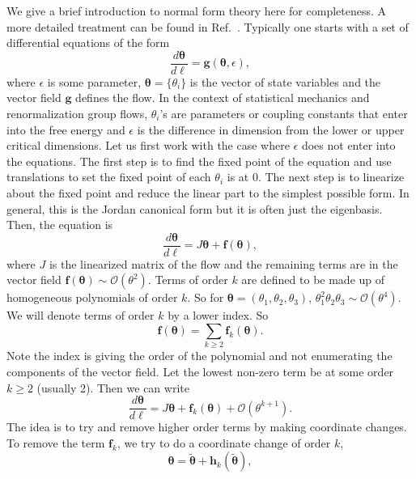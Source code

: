 \documentclass[
 reprint,
 amsmath,amssymb,
 aps, superscriptaddress, pre
]{revtex4-1}
\begin{document}
We give a brief introduction to normal form theory here for completeness. A more detailed treatment can be found in Ref.~\cite{PNFT1}. Typically one starts with a set of differential equations of the form 
\begin{equation}
 \frac{d \bm{\theta}}{d \ell} = \bm{g}(\bm{\theta}, \epsilon) ,
 \end{equation}
 where $\epsilon$ is some parameter, $\bm{\theta} = \{\theta_i\}$ is the vector of state variables and the vector field $\bm{g}$ defines the flow. In the context of statistical mechanics and renormalization group flows, $\theta_i$'s are parameters or coupling constants that enter into the free energy and $\epsilon$ is the difference in dimension from the lower or upper critical dimensions. Let us first work with the case where $\epsilon$ does not enter into the equations. The first step is to find the fixed point of the equation and use translations to set the fixed point of each $\theta_i$ is at 0. The next step is to linearize about the fixed point and reduce the linear part to the simplest possible form. In general, this is the Jordan canonical form but it is often just the eigenbasis. Then, the equation is 
 \begin{equation}
 \frac{d \bm{\theta}}{d \ell} = J \bm{\theta} + \bm{f}(\bm{\theta}) ,
\end{equation}
where $J$ is the linearized matrix of the flow and the remaining terms are in the vector field $\bm{f}(\bm{\theta}) \sim \mathcal{O}(\theta^2)$. Terms of order $k$ are defined to be made up of homogeneous polynomials of order $k$. So for $\bm{\theta} = (\theta_1, \theta_2, \theta_3)$, $\theta_1^2 \theta_2 \theta_3 \sim \mathcal{O}(\theta^4)$. We will denote terms of order $k$ by a lower index. So 
\begin{equation}
 \bm{f}(\bm{\theta}) = \sum_{k \geq 2} \bm{f}_k (\bm{\theta}) .
\end{equation}
Note the index is giving the order of the polynomial and not enumerating the components of the vector field. Let the lowest non-zero term be at some order $k \geq 2$ (usually 2). Then we can write
\begin{equation}
 \frac{d \bm{\theta}}{d \ell} = J \bm{\theta} + \bm{f}_k (\bm{\theta}) + \mathcal{O}(\theta^{k+1}) .
 \end{equation}
The idea is to try and remove higher order terms by making coordinate changes. To remove the term $\bm{f}_k$, we try to do a coordinate change of order $k$,  
\begin{equation}
\label{changecoord}
 \bm{\theta} = \bm{\tilde \theta} + \bm{h}_k (\bm{\tilde \theta}) ,
\end{equation}
\end{document}
